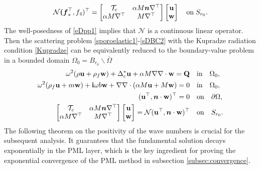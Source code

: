 \documentclass[11pt]{article}
\newcommand{\ba}{\backslash}
\newcommand{\pa}{\partial}
\newcommand{\ov}{\overline}
\newcommand{\Om}{\Omega}
\newcommand{\bs}{\boldsymbol}
\begin{document}
\begin{equation}\label{porodtn}
\mathcal{N}\bs(\bs{f}_s^{\top},f_4)^{\top}=\begin{bmatrix}
\mathcal{T}_c & \alpha M {\bs n} \nabla^{\top} \\
\alpha M \nabla^{\top} &  M \nabla^{\top}
\end{bmatrix} \begin{bmatrix}
\mathbf{u}  \\
\mathbf{w} 
\end{bmatrix} \quad{\rm on}\;S_{r_0}.
\end{equation}	
The  well-posedness of \eqref{eDpp1} implies that $\mathcal{N}$ is a continuous linear operator.
Then the scattering problem \eqref{sporoelastic1}-\eqref{sDBC2} with the Kupradze radiation condition
\eqref{Kupradze} can be equivalently reduced to the boundary-value problem in a bounded domain 
$\Om_0 = B_{r_0} \ba\ov{\Om}$
\begin{subequations}
\begin{align}\label{sporoelastic1_1}
\omega^2(\rho\mathbf{u} +\rho_f \mathbf{w})+\Delta_c^*\mathbf{u}+\alpha M \nabla \nabla \cdot
\mathbf{w}={\bf Q} \quad &{\rm in} \quad \Om_0,\\\label{sporoelastic2_1}
\omega^2(\rho_f \mathbf{u}+m \mathbf{w})+{\bf{i}}\omega b \mathbf{w}+\nabla \nabla \cdot 
(\alpha M \mathbf{u}+ M \mathbf{w})=0\quad &{\rm in} \quad \Om_0,\\\label{sDBC1_1}
(\mathbf{u}^{\top},\bs{n}\cdot \mathbf{w})^{\top}=0 \quad&{\rm on}\quad \pa \Om,\\ \label{sDBC2_1}
\begin{bmatrix}
\mathcal{T}_c & \alpha M {\bs n} \nabla^{\top} \\
\alpha M \nabla^{\top} &  M \nabla^{\top}
\end{bmatrix}\begin{bmatrix}
\mathbf{u}  \\
\mathbf{w} 
\end{bmatrix}=\mathcal{N}(\mathbf{u}^{\top},\bs{n}\cdot \mathbf{w})^{\top} \quad&{\rm on}\quad S_{r_0}.
\end{align}
\end{subequations}
The following theorem on the positivity of the wave numbers is crucial for the subsequent analysis. 
It guarantees that the fundamental solution decays exponentially in the PML layer, which is the key 
ingredient for proving the exponential convergence of the PML method in subsection \ref{subsec:convergence}.
\end{document}
